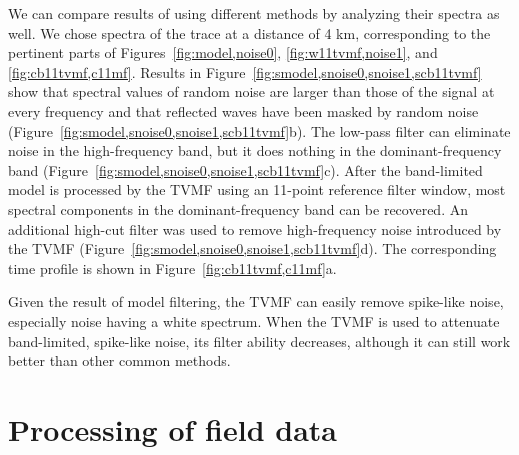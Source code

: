 We can compare results of using different methods 
by analyzing their spectra as well. We chose spectra of the trace at a distance of 4 km, 
corresponding to the pertinent parts of Figures~\ref{fig:model,noise0}, 
\ref{fig:w11tvmf,noise1}, and \ref{fig:cb11tvmf,c11mf}. Results in 
Figure~\ref{fig:smodel,snoise0,snoise1,scb11tvmf} show that spectral values of random 
noise are larger than those of the signal at every frequency and that reflected waves 
have been masked by random noise (Figure~\ref{fig:smodel,snoise0,snoise1,scb11tvmf}b). The low-pass 
filter can eliminate noise in the high-frequency band, but it does nothing in the 
dominant-frequency band (Figure~\ref{fig:smodel,snoise0,snoise1,scb11tvmf}c). After the 
band-limited model is processed by the TVMF using an 11-point reference filter window, most spectral 
components in the dominant-frequency band can be recovered. An additional high-cut filter was used to remove
high-frequency noise introduced by the TVMF (Figure~\ref{fig:smodel,snoise0,snoise1,scb11tvmf}d). The 
corresponding time profile is shown in Figure~\ref{fig:cb11tvmf,c11mf}a.

Given the result of model filtering, the TVMF can easily remove spike-like noise, especially 
noise having a white spectrum. When the TVMF is used to attenuate band-limited, 
spike-like noise, its filter ability decreases, although it can still work better than other 
common methods.

 \section{Processing of field data}

